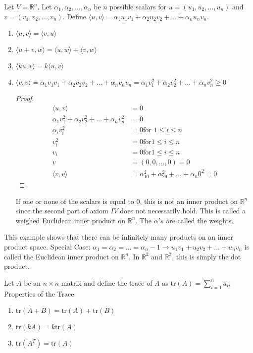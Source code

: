 \documentclass[12pt]{article}
\begin{document}
\begin{example} Let $V = \mathbb{R}^n$. Let $\alpha_1, \alpha_2, \dots, \alpha_n$ be $n$ possible scalars for $u = (u_1, u_2, \dots, u_n)$ and $v = (v_1, v_2, \dots, v_n)$. Define $\langle u, v \rangle = \alpha_1u_1v_1 + \alpha_2u_2v_2 + \dots + \alpha_nu_nv_n$. \begin{enumerate} \item $\langle u,v \rangle = \langle v, u \rangle$ \checkmark 
\item $\langle u + v, w \rangle = \langle u, w \rangle + \langle v, w\rangle$ \checkmark \item $\langle ku, v \rangle = k \langle u, v \rangle$ \checkmark 
\item $\langle v, v \rangle = \alpha_1v_1v_1 + \alpha_2v_2v_2 + \dots + \alpha_nv_nv_n = \alpha_1v_1^2 + \alpha_2v_2^2 + \dots + \alpha_nv_n^2 \geq 0$ \begin{proof} $$
\begin{aligned} \langle u, v \rangle &= 0 \\ \alpha_1v_1^2 + \alpha_2v_2^2 + \dots + \alpha_nv_n^2 &= 0 \\ \alpha_iv_i^2 &= 0 \text{for } 1 \leq i \leq n \\ v_i^2 &= 0 \text{for} 1 \leq i \leq n \\ v_i &= 0 \text{for} 1 \leq i \leq n \\ v &= (0, 0, \dots, 0) = 0 \\ \langle v, v\rangle &= \alpha_10^2 + \alpha_20^2 + \dots + \alpha_n0^2 = 0 \end{aligned} $$ \end{proof} If one or none of the scalars is equal to 0, this is not an inner product on $\mathbb{R}^n$ since the second part of axiom $IV$ does not necessarily hold. This is called a weighed Euclidean inner product on $\mathbb{R}^n$. The $\alpha's$ are called the weights.   \end{enumerate} 
This example shows that there can be infinitely many products on an inner product space. \newline Special Case: $\alpha_1 = \alpha_2 = \dots = \alpha_n - 1 \rightarrow u_1v_1 + u_2v_2 + \dots + u_nv_n$ is called the Euclidean inner product on $\mathbb{R}^n$. In $\mathbb{R}^2$ and $\mathbb{R}^3$, this is simply the dot product.\end{example} 
Let $A$ be an $n \times n$ matrix and define the trace of $A$ as $\mathrm{tr}(A) = \sum_{i = 1}^n a_{ii}$ \newline Properties of the Trace: \begin{enumerate}
\item $\mathrm{tr}(A + B) = \mathrm{tr}(A) + \mathrm{tr}(B)$ \item $\mathrm{tr}(kA) = k\mathrm{tr}(A) $ \item $\mathrm{tr}(A^T) = \mathrm{tr}(A)$ \end{enumerate} 
\end{document}
